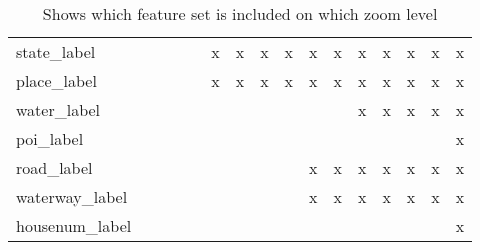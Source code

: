 \begin{table}[]
{\begin{tabular}{l|ccccccccccccccc}
state\_label &  &  &  &  & x & x & x & x & x & x & x & x & x & x & x \\
place\_label &  &  &  &  & x & x & x & x & x & x & x & x & x & x & x \\
water\_label &  &  &  &  &  &  &  &  &  &  & x & x & x & x & x \\
poi\_label &  &  &  &  &  &  &  &  &  &  &  &  &  &  & x \\
road\_label &  &  &  &  &  &  &  &  & x & x & x & x & x & x & x \\
waterway\_label &  &  &  &  &  &  &  &  & x & x & x & x & x & x & x \\
housenum\_label &  &  &  &  &  &  &  &  &  &  &  &  &  &  & x
\end{tabular}
}
\caption{Shows which feature set is included on which zoom level}
\label{my-label}
\end{table}
